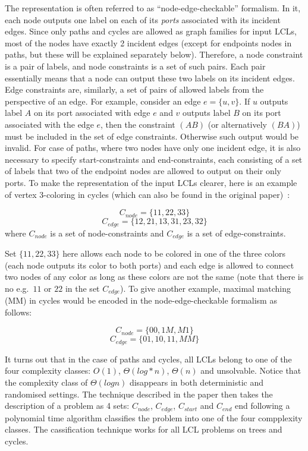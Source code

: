 The representation is often referred to as ``node-edge-checkable'' formalism.
In it, each node outputs one label on each of its \emph{ports} associated with
its incident edges. Since only paths and cycles are allowed as graph families for
input LCLs, most of the nodes have exactly 2 incident edges (except for endpoints nodes
in paths, but these will be explained separately below). Therefore, a node constraint
is a pair of labels, and node constraints is a set of such pairs. Each pair essentially
means that a node can output these two labels on its incident edges. Edge constraints are,
similarly, a set of pairs of allowed labels from the perspective of an edge. For example,
consider an edge $e = \{u, v\}$. If $u$ outputs label $A$ on its port associated with edge $e$
and $v$ outputs label $B$ on its port associated with the edge $e$, then the constraint $(AB)$
(or alternatively $(BA)$) must be included in the set of edge constraints. Otherwise such output
would be invalid. For case of paths, where two nodes have only one incident edge, it is also
necessary to specify start-constraints and end-constraints, each consisting of a set of labels
that two of the endpoint nodes are allowed to output on their only ports. To make the
representation of the input LCLs clearer, here is an example of vertex 3-coloring in cycles
(which can also be found in the original paper)~\cite{Chang2020}:

$$C_{node} = \{ 11, 22, 33 \}$$
$$C_{edge} = \{ 12, 21, 13, 31, 23, 32 \}$$
where $C_{node}$ is a set of node-constraints and $C_{edge}$ is a set of edge-constraints.

Set $\{ 11, 22, 33 \}$ here allows each node to be colored in one of the three colors
(each node outputs its color to both ports) and each edge is allowed to connect
two nodes of any color as long as these colors are not the same (note that there is no
e.g.\ $11$ or $22$ in the set $C_{edge}$). To give another example, maximal matching (MM) in cycles
would be encoded in the node-edge-checkable formalism as follows:

$$C_{node} = \{ 00, 1M, M1 \}$$
$$C_{edge} = \{ 01, 10, 11, MM \}$$

It turns out that in the case of paths and cycles, all LCLs belong to one of the four
complexity classes: $O(1)$, $\Theta(log* n)$, $\Theta(n)$ and unsolvable. Notice that
the complexity class of $\Theta(log n)$ disappears in both deterministic and randomised settings.
The technique described in the paper then takes the description of a problem as 4 sets: $C_{node}$,
$C_{edge}$, $C_{start}$ and $C_{end}$ end following a polynomial time algorithm classifies the
problem into one of the four compplexity classes. The cassification technique works for all LCL
problems on trees and cycles.

